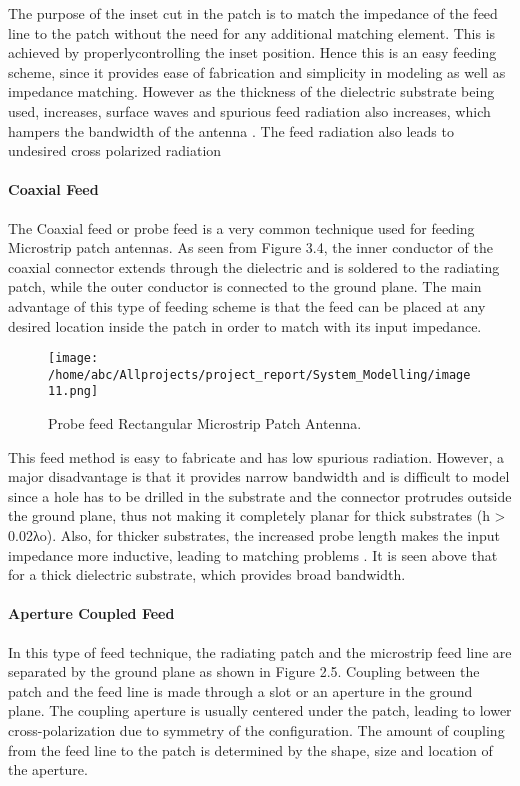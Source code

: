             


         	The purpose of the inset cut in the patch is to match the impedance of the feed line to the patch without the need for any additional matching element. This is achieved by properlycontrolling the inset position. Hence this is an easy feeding scheme, since it provides ease of fabrication and simplicity in modeling as well as impedance matching. However as the thickness of the dielectric substrate being used, increases, surface waves and spurious feed radiation also increases, which hampers the bandwidth of the antenna . The feed radiation also leads to undesired cross polarized radiation
         \paragraph{ Coaxial Feed}
          \justify


            The Coaxial feed or probe feed is a very common technique used for feeding Microstrip patch antennas. As seen from Figure 3.4, the inner conductor of the coaxial connector extends through the dielectric and is soldered to the radiating patch, while the outer conductor is connected to the ground plane. The main advantage of this type of feeding scheme is that the feed can be placed at any desired location inside the patch in order to match with its input impedance.
               \begin{figure}[H]
               	\centering
               	\texttt{[image: /home/abc/Allprojects/project\_report/System\_Modelling/image11.png]}
               	\caption{Probe feed Rectangular Microstrip Patch Antenna. }
               \end{figure}
             This feed method is easy to fabricate and has low spurious radiation. However, a major disadvantage is that it provides narrow bandwidth and is difficult to model since a hole has to be drilled in the substrate and the connector protrudes outside the ground plane, thus not making it completely planar for thick substrates (h > 0.02λo). Also, for thicker substrates, the increased probe length makes the input impedance more inductive, leading to matching problems . It is seen above that for a thick dielectric substrate, which provides broad bandwidth.


          \paragraph{Aperture Coupled Feed}
           \justify
            In this type of feed technique, the radiating patch and the microstrip feed line are separated by the ground plane as shown in Figure 2.5. Coupling between the patch and the feed line is made through a slot or an aperture in the ground plane.  The coupling aperture is usually centered under the patch, leading to lower cross-polarization due to symmetry of the configuration. The amount of coupling from the feed line to the patch is determined by the shape, size and location of the aperture.

